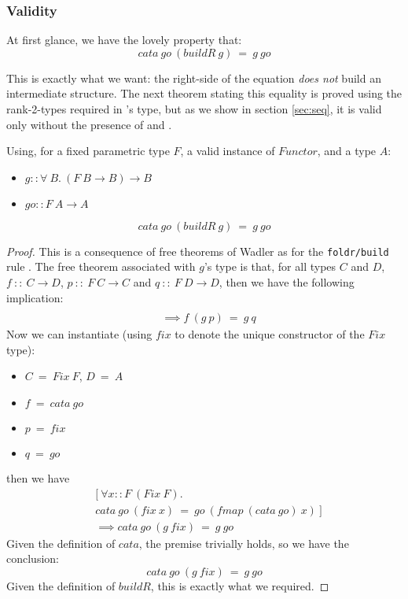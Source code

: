 \subsubsection{Validity}
At first glance, we have the lovely property that:
$$cata\ go\ (buildR\ g)\ =\ g\ go$$

This is exactly what we want: the right-side of the equation \emph{does not} build an intermediate structure. The next theorem stating this equality is proved using the rank-2-types required in 's type, but as we show in section \ref{sec:seq}, it is valid only without the presence of  and .

\begin{theorem}
Using, for a fixed parametric type $F$, a valid instance of $Functor$, and a type $A$:
\begin{itemize}
	\item $g :: \forall\ B.\ (F\ B \to B) \to B$
	\item $go :: F\ A \to A $
\end{itemize}
$$cata\ go\ (buildR\ g)\ =\ g\ go$$
\end{theorem}
\begin{proof}
This is a consequence of free theorems of Wadler \cite{Wadler:1989:TF:99370.99404} as for the \verb|foldr/build| rule \cite{Gill:1993:SCD:165180.165214}. The free theorem associated with $g$'s type is that, for all types $C$ and $D$, $f\ ::\ C \to D$, $p\ ::\ F\ C \to C$ and $q\ ::\ F\ D \to D$, then we have the following implication:
\begin{align*}
[\ \forall& x::C.\ f\ (p\ x)\ =\ q\ (fmap\ f\ x)\ ]\\
&\implies f\ (g\ p)\ =\ g\ q
\end{align*}
Now we can instantiate (using $fix$ to denote the unique constructor of the $Fix$ type):
\begin{itemize}
	\item $C\ =\ Fix\ F$, $D\ =\ A$
	\item $f\ =\ cata\ go$
	\item $p\ =\ fix$
	\item $q\ =\ go$
\end{itemize}
then we have
\begin{align*}
&[\ \forall x::F\ (Fix\ F).\\
&cata\ go\ (fix\ x)\ =\ go\ (fmap\ (cata\ go)\ x)\ ]\\
&\implies cata\ go\ (g\ fix)\ =\ g\ go
\end{align*}
Given the definition of $cata$, the premise trivially holds, so we have the conclusion:
$$cata\ go\ (g\ fix)\ =\ g\ go$$
Given the definition of $buildR$, this is exactly what we required.
\end{proof}

